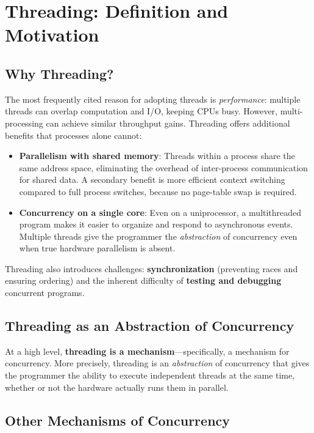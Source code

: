 \documentclass[11pt]{article}
\begin{document}
\section{Threading: Definition and Motivation}

\subsection{Why Threading?}

The most frequently cited reason for adopting threads is \emph{performance}: multiple threads can overlap computation and I/O, keeping CPUs busy. However, multi-processing can achieve similar throughput gains. Threading offers additional benefits that processes alone cannot:

\begin{itemize}
    \item \textbf{Parallelism with shared memory}: Threads within a process share the same address space, eliminating the overhead of inter-process communication for shared data. A secondary benefit is more efficient context switching compared to full process switches, because no page-table swap is required.
    \item \textbf{Concurrency on a single core}: Even on a uniprocessor, a multithreaded program makes it easier to organize and respond to asynchronous events. Multiple threads give the programmer the \emph{abstraction} of concurrency even when true hardware parallelism is absent.
\end{itemize}

Threading also introduces challenges: \textbf{synchronization} (preventing races and ensuring ordering) and the inherent difficulty of \textbf{testing and debugging} concurrent programs.

\subsection{Threading as an Abstraction of Concurrency}

At a high level, \textbf{threading is a mechanism}---specifically, a mechanism for concurrency. More precisely, threading is an \emph{abstraction} of concurrency that gives the programmer the ability to execute independent threads at the same time, whether or not the hardware actually runs them in parallel.

\subsection{Other Mechanisms of Concurrency}
\end{document}
